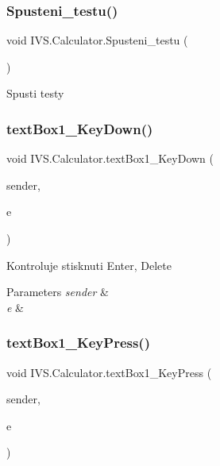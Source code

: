 \subsubsection{\texorpdfstring{Spusteni\+\_\+testu()}{Spusteni\_testu()}}
{\footnotesize\ttfamily void I\+V\+S.\+Calculator.\+Spusteni\+\_\+testu (\begin{DoxyParamCaption}{ }\end{DoxyParamCaption})\hspace{0.3cm}{\ttfamily [protected]}}



Spusti testy 

\mbox{\label{class_i_v_s_1_1_calculator_a060bd753428b6aff7325f535a6c5445f}} 
\subsubsection{\texorpdfstring{text\+Box1\+\_\+\+Key\+Down()}{textBox1\_KeyDown()}}
{\footnotesize\ttfamily void I\+V\+S.\+Calculator.\+text\+Box1\+\_\+\+Key\+Down (\begin{DoxyParamCaption}\item[{object}]{sender,  }\item[{Key\+Event\+Args}]{e }\end{DoxyParamCaption})\hspace{0.3cm}{\ttfamily [protected]}}



Kontroluje stisknuti Enter, Delete 


\begin{DoxyParams}{Parameters}
{\em sender} & \\
\hline
{\em e} & \\
\hline
\end{DoxyParams}
\mbox{\label{class_i_v_s_1_1_calculator_a61fcf6cf05550befa610468b0434e99e}} 
\subsubsection{\texorpdfstring{text\+Box1\+\_\+\+Key\+Press()}{textBox1\_KeyPress()}}
{\footnotesize\ttfamily void I\+V\+S.\+Calculator.\+text\+Box1\+\_\+\+Key\+Press (\begin{DoxyParamCaption}\item[{object}]{sender,  }\item[{Key\+Press\+Event\+Args}]{e }\end{DoxyParamCaption})\hspace{0.3cm}{\ttfamily [protected]}}



